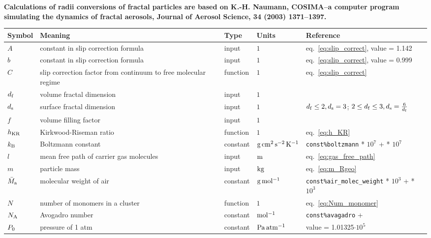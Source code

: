 \documentclass{article}
\providecommand{\e}[1]{\ensuremath{\cdot 10^{#1}}}
\begin{document}
\newcommand{\rr}{\raggedright}
\newcommand{\tn}{\tabularnewline\hline}
\renewcommand{\arraystretch}{1.5}

\textbf{\large Calculations of radii conversions of fractal particles are based on K.-H. Naumann, COSIMA--a computer program simulating the dynamics of fractal aerosols, Journal of Aerosol Science, 34 (2003) 1371--1397.}

\begin{longtable}{|l|p{5.5cm}|l|l|p{4.5cm}|}
\hline \textbf{Symbol} & \textbf{Meaning}                                                       & \textbf{Type} & \textbf{Units}                        &  \textbf{Reference}                                \tn
\hline \endhead
$A$					   & \rr constant in slip correction formula								& input			& $1$									& \rr eq.~\ref{eq:slip_correct}, value = 1.142		 \tn
$b$					   & \rr constant in slip correction formula								& input			& $1$									& \rr eq.~\ref{eq:slip_correct}, value = 0.999		 \tn
$C$					   & \rr slip correction factor from continuum to free molecular regime		& function		& $1$									& \rr eq.~\ref{eq:slip_correct}						 \tn
$d_{\rm f}$			   & \rr volume fractal dimension											& input			& $1$									& \rr 				 \tn
$d_{\rm s}$			   & \rr surface fractal dimension											& input			& $1$									& \rr $d_{\rm f} \leq 2, d_{\rm s} = 3$; $2 \leq d_{\rm f} \leq 3, d_{\rm s} = \frac{6}{d_{\rm f}}$				 \tn
$f$					   & \rr volume filling factor												& input			& $1$									& \rr 					 \tn
$h_{\rm KR}$		   & \rr Kirkwood-Riseman ratio												& function		& $1$									& \rr eq.~\ref{eq:h_KR}			 					 \tn
$k_{\rm B}$			   & \rr Boltzmann constant													& constant		& $\rm g \,cm^{2} \,s^{-2} \,K^{-1}$	& \rr \verb+const%boltzmann+ * $10^7$ 		 		 \tn
$l$					   & \rr mean free path of carrier gas molecules							& input			& $\rm m$								& \rr 	eq.~\ref{eq:gas_free_path}	 \tn
$m$					   & \rr particle mass														& input			& $\rm kg$								& \rr eq.~\ref{eq:m_Rgeo}		 					 \tn
$\bar{M}_{\rm a}$	   & \rr molecular weight of air											& constant		& $\rm g \, mol^{-1}$					& \rr \verb+const%air_molec_weight+ * $10^3$		 \tn
$N$					   & \rr number of monomers in a cluster									& function		& $1$									& \rr eq.~\ref{eq:Num_monomer}	 					 \tn
$N_{\rm A}$			   & \rr Avogadro number													& constant		& $\rm mol^{-1}$						& \rr \verb+const%avagadro+ 				 		 \tn
$P_{\rm 0}$            & \rr pressure of 1 atm	            			 			            & constant	    & $\rm Pa \, atm^{-1}$                  & \rr value = 1.01325\e{5}		                     \tn

\end{longtable}
\end{document}

